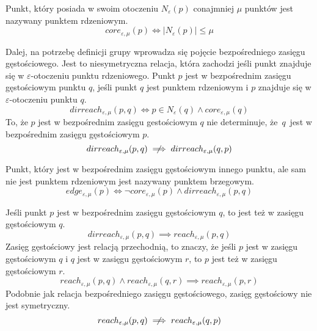 Punkt, który posiada w swoim otoczeniu $ N_\varepsilon(p) $ conajmniej $ \mu $ punktów jest nazywany punktem rdzeniowym.
\begin{equation}\label{core-point}
	core_{\varepsilon,\mu}(p) \iff |N_\varepsilon(p)| \le \mu
\end{equation}


Dalej, na potrzebę definicji grupy wprowadza się pojęcie bezpośredniego zasięgu gęstościowego. Jest to niesymetryczna relacja, która zachodzi jeśli punkt znajduje się w $ \varepsilon $-otoczeniu punktu rdzeniowego. Punkt $ p $ jest w bezpośrednim zasięgu gęstościowym punktu $ q $, jeśli punkt $ q $ jest punktem rdzeniowym i $ p $ znajduje się w $ \varepsilon $-otoczeniu punktu $ q $.
\begin{equation} \label{direct-reachability}
	dirreach_{\varepsilon,\mu}(p, q) \iff p \in N_\varepsilon(q) \land core_{\varepsilon,\mu}(q)
\end{equation}
To, że $ p $ jest w bezpośrednim zasięgu gestościowym $ q $ nie determinuje, \mbox{że $ q $ jest} w bezpośrednim zasięgu gęstościowym $ p $.
\begin{equation} \label{direct-reachability-asymmetry}
	dirreach_{\varepsilon,\mu}(p, q) \centernot \implies dirreach_{\varepsilon,\mu}(q, p)
\end{equation}

Punkt, który jest w bezpośrednim zasięgu gęstościowym innego punktu, ale sam nie jest punktem rdzeniowym jest nazywany punktem brzegowym.
\begin{equation}\label{edge-point}
	edge_{\varepsilon,\mu}(p) \iff \neg core_{\varepsilon,\mu}(p) \land dirreach_{\varepsilon,\mu}(p,q)
\end{equation}

Jeśli punkt $ p $ jest w bezpośrednim zasięgu gęstościowym $ q $, to jest też w zasięgu gęstościowym $ q $. 
\begin{equation}
	dirreach_{\varepsilon,\mu}(p, q) \implies reach_{\varepsilon,\mu}(p, q)
\end{equation}
Zasięg gęstościowy jest relacją przechodnią, to znaczy, że jeśli $ p $ jest w zasięgu gęstościowym $ q $  i $ q $ jest w zasięgu gęstościowym $ r $, to $ p $ jest też w zasięgu gęstościowym $ r $.
\begin{equation}
	reach_{\varepsilon,\mu}(p, q) \land reach_{\varepsilon,\mu}(q, r) \implies reach_{\varepsilon,\mu}(p, r)
\end{equation}
Podobnie jak relacja bezpośredniego zasięgu gęstościowego, zasięg gęstościowy nie jest symetryczny.
\begin{equation}
	reach_{\varepsilon,\mu}(p, q) \centernot \implies reach_{\varepsilon,\mu}(q, p)
\end{equation}


